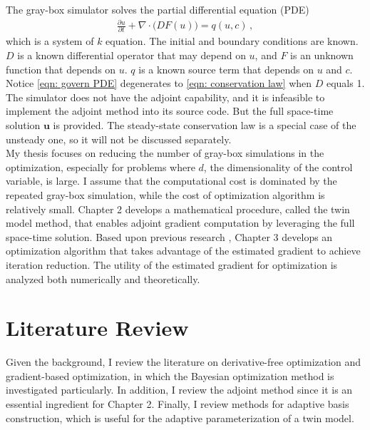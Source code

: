 The gray-box simulator solves the partial differential equation (PDE)
\begin{equation}\begin{split}
    \frac{\partial u}{\partial t}+ \nabla \cdot \big( D F(u) \big) = q(u,c)\,,
\end{split}
\label{eqn: govern PDE}
\end{equation}
which is a system of $k$ equation. 
The initial and boundary conditions are known.
$D$ is a known differential operator that may depend on $u$, and
$F$ is an unknown function that depends on $u$.
$q$ is a known source term that depends on $u$ and $c$.
Notice \eqref{eqn: govern PDE} degenerates to \eqref{eqn: conservation law} when $D$ equals 1.
The simulator does not have the adjoint capability,
and it is infeasible to implement the adjoint method into its source code. But the full space-time solution 
$\boldsymbol{u}$ is provided. The steady-state conservation law is a special case
of the unsteady one, so it will not be discussed separately.\\

My thesis focuses on reducing the number of gray-box simulations in the optimization,
especially for problems where $d$, the dimensionality of the control variable,
is large. I assume that the computational cost
is dominated by the repeated gray-box simulation, while the cost of optimization algorithm 
is relatively small. Chapter 2 develops a mathematical procedure, called the twin model method, 
that enables adjoint gradient computation by leveraging the full space-time solution.
Based upon previous research \cite{derivative RKHS, convergen EI, practical Bayesian, review EI, grad coKriging, KennedyOhagan1, KennedyOhagan2}, 
Chapter 3 develops an optimization algorithm that takes 
advantage of the estimated gradient to achieve iteration reduction. The utility of
the estimated gradient for optimization is analyzed both numerically and theoretically.

\section{Literature Review}
\label{section: literature}

Given the background, I review the literature on derivative-free optimization and gradient-based optimization, in which 
the Bayesian optimization method is investigated particularly.
In addition, I review the adjoint method since it is an essential ingredient for Chapter 2. Finally, I review methods for adaptive basis construction,
which is useful for the adaptive parameterization of a twin model.

